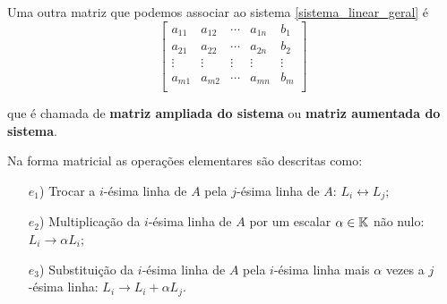 \documentclass{beamer}
\begin{document}
    \begin{frame}
        Uma outra matriz que podemos associar ao sistema \eqref{sistema_linear_geral} \'e
        \[
	    \begin{bmatrix}
                a_{11} & a_{12} & \cdots & a_{1n} & b_1\\
		a_{21} & a_{22} & \cdots & a_{2n} & b_2\\
		\vdots & \vdots & \vdots & \vdots & \vdots\\
		a_{m1} & a_{m2} & \cdots & a_{mn} & b_m\\
            \end{bmatrix}
        \]

        que \'e chamada de \textbf{matriz ampliada do sistema} ou \textbf{matriz aumentada do sistema}.
    \end{frame}

    \begin{frame}
        Na forma matricial as opera\c{c}\~oes elementares s\~ao descritas como:

        \vspace{.3cm}

        \begin{itemize}
            \item[$e_1$)] Trocar a $i$-\'esima linha de $A$ pela $j$-\'esima linha de $A$: $L_i \leftrightarrow L_j$;

            \vspace{.3cm}

            \item[$e_2$)] Multiplica\c{c}\~ao da $i$-\'esima linha de $A$ por um escalar $\alpha \in \mathbb{K}$ n\~ao nulo: $L_i \rightarrow \alpha L_i$;
 
            \vspace{.3cm}

           \item[$e_3$)] Substitui\c{c}\~ao da $i$-\'esima linha de $A$ pela $i$-\'esima linha mais $\alpha$ vezes a $j$-\'esima linha: $L_i \rightarrow L_i + \alpha L_j$.
        \end{itemize}
    \end{frame}
\end{document}
